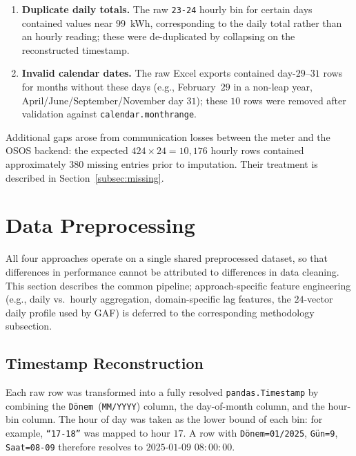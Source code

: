 \documentclass{article}
\begin{document}
\begin{enumerate}[leftmargin=1.5em,itemsep=2pt]
  \item \textbf{Duplicate daily totals.} The raw \texttt{23-24} hourly bin for certain days contained values near $99$~kWh, corresponding to the daily total rather than an hourly reading; these were de-duplicated by collapsing on the reconstructed timestamp.
  \item \textbf{Invalid calendar dates.} The raw Excel exports contained day-$29$--$31$ rows for months without these days (e.g., February~$29$ in a non-leap year, April/June/September/November day $31$); these $10$ rows were removed after validation against \texttt{calendar.monthrange}.
\end{enumerate}

Additional gaps arose from communication losses between the meter and the OSOS backend: the expected $424 \times 24 = 10{,}176$ hourly rows contained approximately $380$ missing entries prior to imputation. Their treatment is described in Section~\ref{subsec:missing}.

\section{Data Preprocessing}\label{sec:preprocessing}
All four approaches operate on a single shared preprocessed dataset, so that differences in performance cannot be attributed to differences in data cleaning. This section describes the common pipeline; approach-specific feature engineering (e.g., daily vs.\ hourly aggregation, domain-specific lag features, the $24$-vector daily profile used by GAF) is deferred to the corresponding methodology subsection.

\subsection{Timestamp Reconstruction}
Each raw row was transformed into a fully resolved \texttt{pandas.Timestamp} by combining the \texttt{D\"onem}~(\texttt{MM/YYYY}) column, the day-of-month column, and the hour-bin column. The hour of day was taken as the lower bound of each bin: for example, \texttt{``17-18''} was mapped to hour $17$. A row with \texttt{D\"onem=01/2025}, \texttt{G\"un=9}, \texttt{Saat=08-09} therefore resolves to $2025\text{-}01\text{-}09$ $08{:}00{:}00$.
\end{document}
